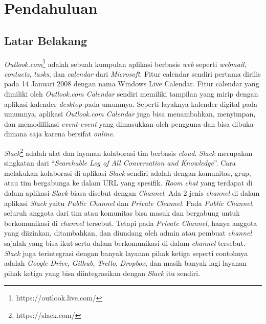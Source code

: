 \chapter{Pendahuluan}
\label{chap:intro}
   
\section{Latar Belakang}
\label{sec:label}

\textit{Outlook.com}\footnote{https://outlook.live.com/} adalah sebuah kumpulan aplikasi berbasis \textit{web} seperti \textit{webmail}, \textit{contacts}, \textit{tasks}, dan \textit{calendar} dari \textit{Microsoft}. Fitur calendar sendiri pertama dirilis pada 14 Januari 2008 dengan nama Windows Live Calendar. Fitur calendar yang dimiliki oleh \textit{Outlook.com Calendar} sendiri memiliki tampilan yang mirip dengan aplikasi kalender \textit{desktop} pada umumnya. Seperti layaknya kalender digital pada umumnya, aplikasi \textit{Outlook.com Calendar} juga bisa menambahkan, menyimpan, dan memodifikasi \textit{event-event} yang dimasukkan oleh pengguna dan bisa dibuka dimana saja karena bersifat \textit{online}. 

\textit{Slack}\footnote{https://slack.com/} adalah alat dan layanan kolaborasi tim berbasis \textit{cloud}. \textit{Slack} merupakan singkatan dari ``\textit{Searchable Log of All Conversation and Knowledge}''. Cara melakukan kolaborasi di aplikasi \textit{Slack} sendiri adalah dengan komunitas, grup, atau tim bergabunga ke dalam URL yang spesifik. \textit{Room chat} yang terdapat di dalam aplikasi \textit{Slack} biasa disebut dengan \textit{Channel}. Ada 2 jenis \textit{channel} di dalam aplikasi \textit{Slack} yaitu \textit{Public Channel} dan \textit{Private Channel}. Pada \textit{Public Channel}, seluruh anggota dari tim atau komunitas bisa masuk dan bergabung untuk berkomunikasi di \textit{channel} tersebut. Tetapi pada \textit{Private Channel}, hanya anggota yang diizinkan, ditambahkan, dan diundang oleh admin atau pembuat \textit{channel} sajalah yang bisa ikut serta dalam berkomunikasi di dalam \textit{channel} tersebut. \textit{Slack} juga terintegrasi dengan banyak layanan pihak ketiga seperti contohnya adalah \textit{Google Drive}, \textit{Github}, \textit{Trello}, \textit{Dropbox}, dan masih banyak lagi layanan pihak ketiga yang bisa diintegrasikan dengan \textit{Slack} itu sendiri. 

